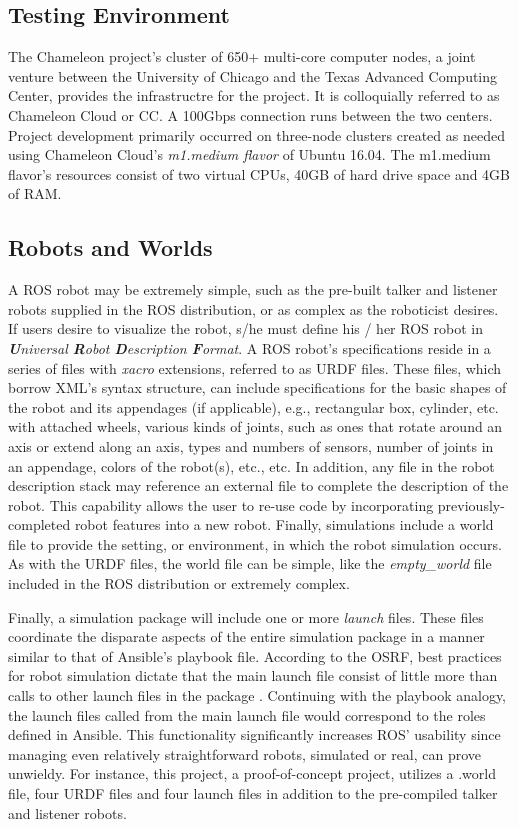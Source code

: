 \documentclass[9pt,twocolumn,twoside]{../../styles/osajnl}
\begin{document}
\subsection{Testing Environment}
The Chameleon project's cluster of 650+ multi-core computer nodes, a joint venture between the University of Chicago and the Texas Advanced Computing Center, provides the infrastructre for the project.  It is colloquially referred to as Chameleon Cloud or CC.  A 100Gbps connection runs between the two centers. Project development primarily occurred on three-node clusters created as needed using Chameleon Cloud's \textit{m1.medium flavor} of Ubuntu 16.04.  The m1.medium flavor's resources consist of two virtual CPUs, 40GB of hard drive space and 4GB of RAM.  

\subsection{Robots and Worlds}
A ROS robot may be extremely simple, such as the pre-built talker and listener robots supplied in the ROS distribution, or as complex as the roboticist desires.  If users desire to visualize the robot, s/he must define his / her ROS robot in \textit{\textbf{U}niversal \textbf{R}obot \textbf{D}escription \textbf{F}ormat}.  A ROS robot's specifications reside in a series of files with \textit{xacro} extensions, referred to as URDF files.  These files, which borrow XML's syntax structure, can include specifications for the basic shapes of the robot and its appendages (if applicable), e.g., rectangular box, cylinder, etc. with attached wheels, various kinds of joints, such as ones that rotate around an axis or extend along an axis, types and numbers of sensors, number of joints in an appendage, colors of the robot(s), etc., etc.  In addition, any file in the robot description stack may reference an external file to complete the description of the robot.  This capability allows the user to re-use code by incorporating previously-completed robot features into a new robot.  Finally, simulations include a world file to provide the setting, or environment, in which the robot simulation occurs.  As with the URDF files, the world file can be simple, like the \textit{empty\_world} file included in the ROS distribution or extremely complex.  

Finally, a simulation package will include one or more \textit{launch} files.  These files coordinate the disparate aspects of the entire simulation package in a manner similar to that of Ansible's playbook file.  According to the OSRF, best practices for robot simulation dictate that the main launch file consist of little more than calls to other launch files in the package \cite{www-ros-launch}.  Continuing with the playbook analogy, the launch files called from the main launch file would correspond to the roles defined in Ansible.  This functionality significantly increases ROS' usability since managing even relatively straightforward robots, simulated or real, can prove unwieldy. For instance, this project, a proof-of-concept project, utilizes a .world file, four URDF files and four launch files in addition to the pre-compiled talker and listener robots.  
\end{document}
